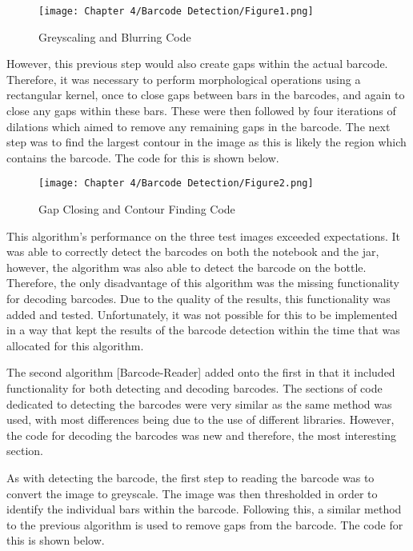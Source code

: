 \begin{figure}[H]        
    \centering
    \texttt{[image: Chapter 4/Barcode Detection/Figure1.png]}
    \caption{Greyscaling and Blurring Code}
    \label{fig:bc1}
\end{figure} 

However, this previous step would also create gaps within the actual barcode.
Therefore, it was necessary to perform morphological operations using a rectangular kernel, once to close gaps between bars in the barcodes, and again to close any gaps within these bars.
These were then followed by four iterations of dilations which aimed to remove any remaining gaps in the barcode.
The next step was to find the largest contour in the image as this is likely the region which contains the barcode.
The code for this is shown below.

\begin{figure}[H]        
    \centering
    \texttt{[image: Chapter 4/Barcode Detection/Figure2.png]}
    \caption{Gap Closing and Contour Finding Code}
    \label{fig:bc2}
\end{figure} 

This algorithm's performance on the three test images exceeded expectations.
It was able to correctly detect the barcodes on both the notebook and the jar, however, the algorithm was also able to detect the barcode on the bottle.
Therefore, the only disadvantage of this algorithm was the missing functionality for decoding barcodes.
Due to the quality of the results, this functionality was added and tested.
Unfortunately, it was not possible for this to be implemented in a way that kept the results of the barcode detection within the time that was allocated for this algorithm.

The second algorithm [Barcode-Reader] added onto the first in that it included functionality for both detecting and decoding barcodes.
The sections of code dedicated to detecting the barcodes were very similar as the same method was used, with most differences being due to the use of different libraries.
However, the code for decoding the barcodes was new and therefore, the most interesting section.

As with detecting the barcode, the first step to reading the barcode was to convert the image to greyscale.
The image was then thresholded in order to identify the individual bars within the barcode.
Following this, a similar method to the previous algorithm is used to remove gaps from the barcode.
The code for this is shown below.

